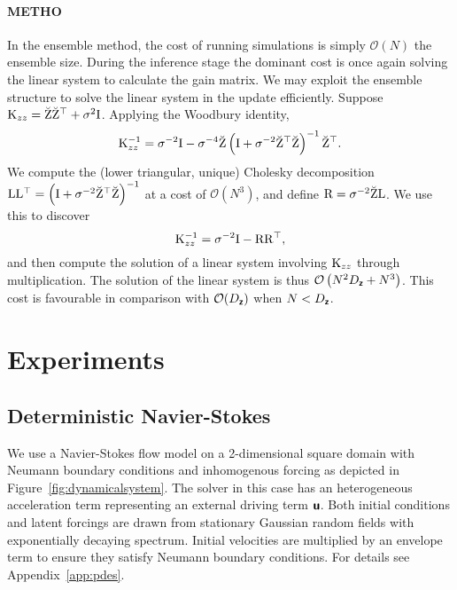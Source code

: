 \documentclass{article}
\theoremstyle{plain}
\theoremstyle{definition}
\theoremstyle{remark}
\begin{document}
\paragraph{\textbf{METHO}} In the ensemble method, the cost of running simulations is simply \(\mathcal{O}\left(N\right)\) the ensemble size.
During the inference stage the dominant cost is once again solving the linear system to calculate the gain matrix.
We may exploit the ensemble structure to solve the linear system in the update efficiently.
Suppose \(\mathrm{K}_{zz}=\breve{\mathrm{Z}} \breve{\mathrm{Z}}^{\top}+\sigma^2\mathrm{I}\).
Applying the Woodbury identity,
\begin{align*}
\mathrm{K}_{zz}^{-1}=\sigma^{-2}\mathrm{I}-\sigma^{-4} \breve{\mathrm{Z}}\left(\mathrm{I}+\sigma^{-2}\breve{\mathrm{Z}}^{\top}  \breve{\mathrm{Z}}\right)^{-1} \breve{\mathrm{Z}}^{\top}.
\end{align*}
We compute the (lower triangular, unique) Cholesky decomposition \(\mathrm{L} \mathrm{L}^{\top}=\left(\mathrm{I}+\sigma^{-2}\breve{\mathrm{Z}}^{\top} \breve{\mathrm{Z}}\right)^{-1}\) at a cost of $\mathcal{O}(N^3)$, and define \(\mathrm{R}=\sigma^{-2}\breve{\mathrm{Z}} \mathrm{L}\).
We use this to discover
\[
\mathrm{K}_{zz}^{-1}=\sigma^{-2}\mathrm{I}-\mathrm{R} \mathrm{R}^{\top},
\]
and then compute the solution of a linear system involving $\mathrm{K}_{zz}$ through multiplication.
The solution of the linear system is thus \(\mathcal{O}\left(N^2 D_{\boldsymbol{\mathsf{z}}}+N^3\right)\).
This cost is favourable in comparison with $\mathcal{O}(D_{\boldsymbol{\mathsf{z}}})$ when $N < D_{\boldsymbol{\mathsf{z}}}$.

\section{Experiments}


\subsection{Deterministic Navier-Stokes}

We use a Navier-Stokes flow model on a 2-dimensional square domain with Neumann boundary conditions and inhomogenous forcing as depicted in Figure~\ref{fig:dynamicalsystem}.
The solver in this case has an heterogeneous acceleration term representing an external driving term \(\boldsymbol{\mathsf{\boldsymbol{\mathsf{u}}}}\).
Both initial conditions and latent forcings are drawn from stationary Gaussian random fields with exponentially decaying spectrum.
Initial velocities are multiplied by an envelope term to ensure they satisfy Neumann boundary conditions.
For details see Appendix~\ref{app:pdes}.
\end{document}
